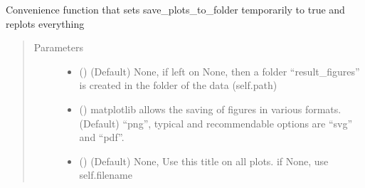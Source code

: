 \documentclass[letterpaper,10pt,english]{sphinxmanual}
\begin{document}
\begin{fulllineitems}
\begin{fulllineitems}
\label{\detokenize{plot_func:plot_func.TA.Save_Plots}}
Convenience function that sets save\_plots\_to\_folder temporarily to true and replots everything
\begin{quote}\begin{description}
\item[{Parameters}] \leavevmode\begin{itemize}
\item {} 
 (\sphinxstyleliteralemphasis{\sphinxupquote{, }}\sphinxstyleliteralemphasis{\sphinxupquote{, }}) \textendash{} (Default) None, if left on None, then a folder “result\_figures” is created in the folder
of the data (self.path)

\item {} 
 (\sphinxstyleliteralemphasis{\sphinxupquote{ (}}\sphinxstyleliteralemphasis{\sphinxupquote{)}}\sphinxstyleliteralemphasis{\sphinxupquote{, }}) \textendash{} matplotlib allows the saving of figures in various formats. (Default) “png”,
typical and recommendable options are “svg” and “pdf”.

\item {} 
 (\sphinxstyleliteralemphasis{\sphinxupquote{, }}) \textendash{} (Default) None, Use this title on all plots. if None, use self.filename


\end{itemize}
\end{description}
\end{quote}
\end{fulllineitems}
\end{fulllineitems}
\end{document}
